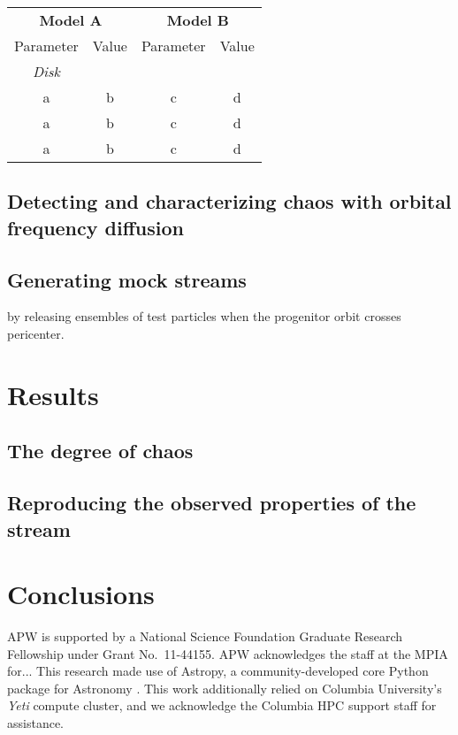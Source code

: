 \documentclass[letterpaper,12pt,preprint]{aastex}
\begin{document}
\begin{table*}[ht]
\begin{center}
	\begin{tabular}{ c  c | c  c}
	         \toprule
	         \multicolumn{2}{c|}{\bf Model A} & \multicolumn{2}{c}{\bf Model B} \\
	         Parameter & Value & Parameter & Value \\\toprule
		{\it Disk} &  &  & \\
		a & b & c & d\\
		a & b & c & d\\\midrule
		a & b & c & d\\
		\bottomrule
		\end{tabular}
	\caption{ \label{tbl:potential}}
\end{center}
\end{table*}


\subsection{Detecting and characterizing chaos with orbital frequency diffusion}\label{sec:chaos-indicator}

\subsection{Generating mock streams}\label{sec:mocks}

by releasing ensembles of test particles when the progenitor orbit crosses pericenter.


\section{Results}

\subsection{The degree of chaos}\label{sec:results1}

\subsection{Reproducing the observed properties of the stream}\label{sec:results2}

\section{Conclusions}\label{sec:conclusions}

\acknowledgements
APW is supported by a National Science Foundation Graduate Research Fellowship under Grant No.\ 11-44155.
APW acknowledges the staff at the MPIA for...
This research made use of Astropy, a community-developed core Python package for Astronomy \citep{astropy13}.
This work additionally relied on Columbia University's \emph{Yeti} compute cluster, and we acknowledge the Columbia HPC support staff for assistance. \\



\end{document}

